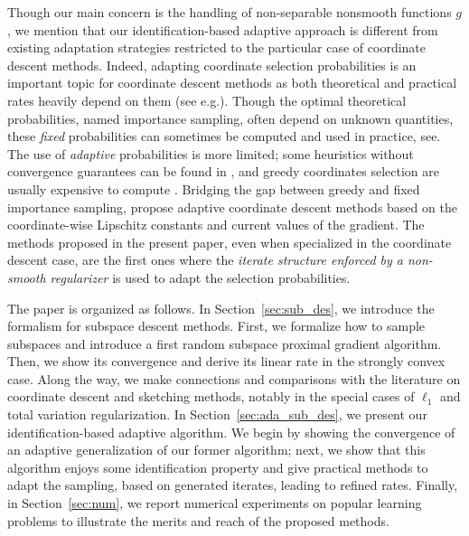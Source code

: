 Though our main concern is the handling of non-separable nonsmooth functions $g$, we mention that our identification-based adaptive approach is different from existing adaptation strategies restricted to the particular case of coordinate descent methods. Indeed, adapting coordinate selection probabilities is an important topic for coordinate descent methods as both theoretical and practical rates heavily depend on them (see e.g.\;\cite{richtarik2014iteration,necoara2014random}).
Though the optimal theoretical probabilities, named importance sampling, often depend on unknown quantities, these \emph{fixed} probabilities can sometimes be computed and used in practice, see\;\cite{zhao2015stochastic,richtarik2016optimal}.
The use of \emph{adaptive} probabilities is more limited; some heuristics without convergence guarantees can be found in \cite{loshchilov2011adaptive,glasmachers2013accelerated}, and greedy coordinates selection
are usually expensive to compute \cite{dhillon2011nearest,nutini2015coordinate,nutini2017let}. Bridging the gap between greedy and fixed importance sampling, \cite{perekrestenko2017faster,namkoong2017adaptive,stich2017safe} propose adaptive coordinate descent methods based on the coordinate-wise Lipschitz constants and current values of the gradient. 
The methods proposed in the present paper, even when specialized in the coordinate descent case, are the first ones where the \emph{iterate structure enforced by a non-smooth regularizer} is used to adapt the selection probabilities.

The paper is organized as follows. In Section~\ref{sec:sub_des}, we introduce the formalism for subspace descent methods. First, we formalize how to sample subspaces and introduce a first random subspace proximal gradient algorithm. Then, we show its convergence and derive its linear rate in the strongly convex case. Along the way, we make connections and comparisons with the literature on coordinate descent and sketching methods, notably in the special cases of $\ell_1$ and total variation regularization. In Section~\ref{sec:ada_sub_des}, we present our identification-based adaptive algorithm. We begin by showing the convergence of an adaptive generalization of our former algorithm; next, we show that this algorithm enjoys some identification property and give practical methods to adapt the sampling, based on generated iterates, leading to refined rates. Finally, in Section~\ref{sec:num}, we report numerical experiments on popular learning problems to illustrate the merits and reach of the proposed methods.



